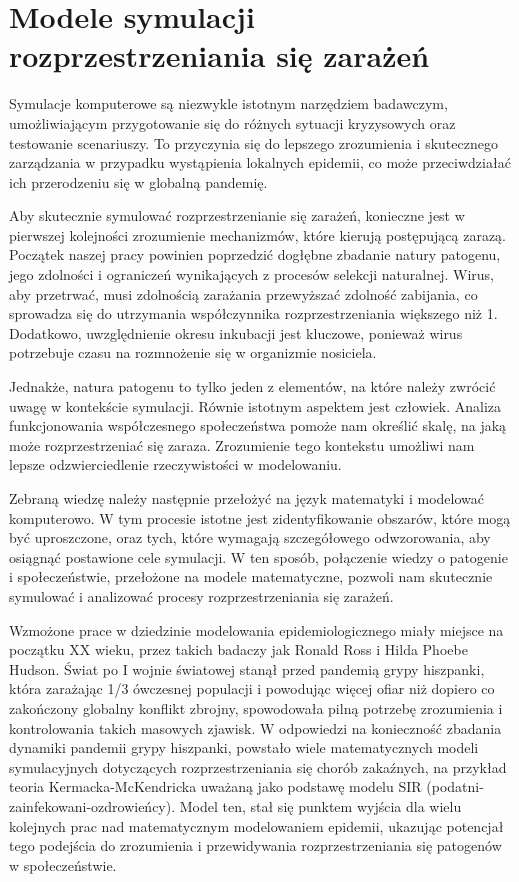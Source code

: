 \chapter{Modele symulacji rozprzestrzeniania się zarażeń}
Symulacje komputerowe są niezwykle istotnym narzędziem badawczym, umożliwiającym przygotowanie się do różnych sytuacji kryzysowych oraz testowanie scenariuszy. To przyczynia się do lepszego zrozumienia i skutecznego zarządzania w przypadku wystąpienia lokalnych epidemii, co może przeciwdziałać ich przerodzeniu się w globalną pandemię.

Aby skutecznie symulować rozprzestrzenianie się zarażeń, konieczne jest w pierwszej kolejności zrozumienie mechanizmów, które kierują postępującą zarazą. Początek naszej pracy powinien poprzedzić dogłębne zbadanie natury patogenu, jego zdolności i ograniczeń wynikających z procesów selekcji naturalnej. Wirus, aby przetrwać, musi zdolnością zarażania przewyższać zdolność zabijania, co sprowadza się do utrzymania współczynnika rozprzestrzeniania większego niż 1. Dodatkowo, uwzględnienie okresu inkubacji jest kluczowe, ponieważ wirus potrzebuje czasu na rozmnożenie się w organizmie nosiciela.

Jednakże, natura patogenu to tylko jeden z elementów, na które należy zwrócić uwagę w kontekście symulacji. Równie istotnym aspektem jest człowiek. Analiza funkcjonowania współczesnego społeczeństwa pomoże nam określić skalę, na jaką może rozprzestrzeniać się zaraza. Zrozumienie tego kontekstu umożliwi nam lepsze odzwierciedlenie rzeczywistości w modelowaniu.

Zebraną wiedzę należy następnie przełożyć na język matematyki i modelować komputerowo. W tym procesie istotne jest zidentyfikowanie obszarów, które mogą być uproszczone, oraz tych, które wymagają szczegółowego odwzorowania, aby osiągnąć postawione cele symulacji. W ten sposób, połączenie wiedzy o patogenie i społeczeństwie, przełożone na modele matematyczne, pozwoli nam skutecznie symulować i analizować procesy rozprzestrzeniania się zarażeń. 

Wzmożone prace w dziedzinie modelowania epidemiologicznego miały miejsce na początku XX wieku, przez takich badaczy jak Ronald Ross\cite{bib:RossRonald} i Hilda Phoebe Hudson\cite{bib:RossHudson}\cite{bib:RossHudson2}. Świat po I wojnie światowej stanął przed pandemią grypy hiszpanki, która zarażając 1/3 ówczesnej populacji i powodując więcej ofiar niż dopiero co zakończony globalny konflikt zbrojny\cite{bib:cdc1918pandemic}, spowodowała pilną potrzebę zrozumienia i kontrolowania takich masowych zjawisk. W odpowiedzi na konieczność zbadania dynamiki pandemii grypy hiszpanki, powstało wiele matematycznych modeli symulacyjnych dotyczących rozprzestrzeniania się chorób zakaźnych, na przykład teoria Kermacka-McKendricka\cite{bib:Kermack} uważaną jako podstawę modelu SIR (podatni-zainfekowani-ozdrowieńcy). Model ten, stał się punktem wyjścia dla wielu kolejnych prac nad matematycznym modelowaniem epidemii, ukazując potencjał tego podejścia do zrozumienia i przewidywania rozprzestrzeniania się patogenów w społeczeństwie.

